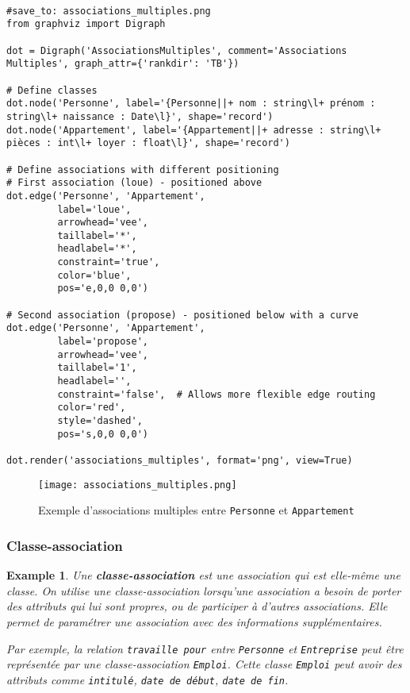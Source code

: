\documentclass{article}
\newtheorem{example}{Example}
\begin{document}
\begin{verbatim}

#save_to: associations_multiples.png
from graphviz import Digraph

dot = Digraph('AssociationsMultiples', comment='Associations Multiples', graph_attr={'rankdir': 'TB'})

# Define classes
dot.node('Personne', label='{Personne||+ nom : string\l+ prénom : string\l+ naissance : Date\l}', shape='record')
dot.node('Appartement', label='{Appartement||+ adresse : string\l+ pièces : int\l+ loyer : float\l}', shape='record')

# Define associations with different positioning
# First association (loue) - positioned above
dot.edge('Personne', 'Appartement', 
         label='loue', 
         arrowhead='vee', 
         taillabel='*', 
         headlabel='*',
         constraint='true',
         color='blue',
         pos='e,0,0 0,0')

# Second association (propose) - positioned below with a curve
dot.edge('Personne', 'Appartement', 
         label='propose', 
         arrowhead='vee', 
         taillabel='1',
         headlabel='',
         constraint='false',  # Allows more flexible edge routing
         color='red',
         style='dashed',
         pos='s,0,0 0,0')

dot.render('associations_multiples', format='png', view=True)

\end{verbatim}

\begin{figure}[h]
    \centering
    \texttt{[image: associations\_multiples.png]}
    \caption{Exemple d'associations multiples entre \texttt{Personne} et \texttt{Appartement}}
    \label{fig:associations_multiples}
\end{figure}


\subsubsection{Classe-association}
\begin{example}
Une \textbf{classe-association} est une association qui est elle-même une classe. On utilise une classe-association lorsqu'une association a besoin de porter des attributs qui lui sont propres, ou de participer à d'autres associations.  Elle permet de paramétrer une association avec des informations supplémentaires.

Par exemple, la relation \texttt{travaille pour} entre \texttt{Personne} et \texttt{Entreprise} peut être représentée par une classe-association \texttt{Emploi}.  Cette classe \texttt{Emploi} peut avoir des attributs comme \texttt{intitulé}, \texttt{date de début}, \texttt{date de fin}.
\end{example}
\end{document}
